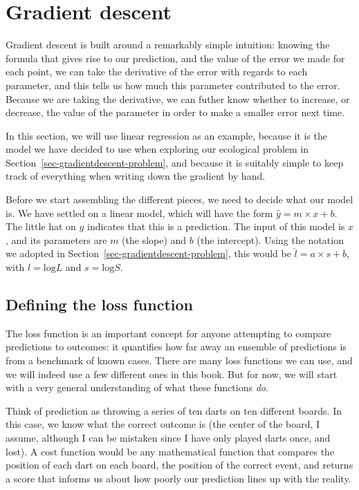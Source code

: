 \documentclass[
  letterpaper,
]{scrbook}
\begin{document}
\section{Gradient descent}\label{sec-gradientdescent-explanation}

Gradient descent is built around a remarkably simple intuition: knowing
the formula that gives rise to our prediction, and the value of the
error we made for each point, we can take the derivative of the error
with regards to each parameter, and this tells us how much this
parameter contributed to the error. Because we are taking the
derivative, we can futher know whether to increase, or decrease, the
value of the parameter in order to make a smaller error next time.

In this section, we will use linear regression as an example, because it
is the model we have decided to use when exploring our ecological
problem in Section~\ref{sec-gradientdescent-problem}, and because it is
suitably simple to keep track of everything when writing down the
gradient by hand.

Before we start assembling the different pieces, we need to decide what
our model is. We have settled on a linear model, which will have the
form \(\hat y = m\times x + b\). The little hat on \(\hat y\) indicates
that this is a prediction. The input of this model is \(x\), and its
parameters are \(m\) (the slope) and \(b\) (the intercept). Using the
notation we adopted in Section~\ref{sec-gradientdescent-problem}, this
would be \(\hat l = a \times s + b\), with \(l = \text{log} L\) and
\(s = \text{log} S\).

\subsection{Defining the loss
function}\label{sec-gradientdescent-lossfunctions}

The loss function is an important concept for anyone attempting to
compare predictions to outcomes: it quantifies how far away an ensemble
of predictions is from a benchmark of known cases. There are many loss
functions we can use, and we will indeed use a few different ones in
this book. But for now, we will start with a very general understanding
of what these functions \emph{do}.

Think of prediction as throwing a series of ten darts on ten different
boards. In this case, we know what the correct outcome is (the center of
the board, I assume, although I can be mistaken since I have only played
darts once, and lost). A cost function would be any mathematical
function that compares the position of each dart on each board, the
position of the correct event, and returns a score that informs us about
how poorly our prediction lines up with the reality.
\end{document}
